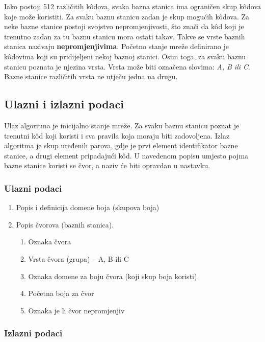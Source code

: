\documentclass[times, utf8, diplomski, numeric]{fer}
\begin{document}
Iako postoji 512 različitih k\^{o}dova, svaka bazna stanica ima ograničen skup k\^{o}dova koje može koristiti. Za svaku baznu stanicu zadan je skup mogućih k\^{o}dova. Za neke bazne stanice postoji svojstvo nepromjenjivosti, što znači da k\^{o}d koji je trenutno zadan za tu baznu stanicu mora ostati takav. Takve se vrste baznih stanica nazivaju \textbf{nepromjenjivima}. Početno stanje mreže definirano je k\^{o}dovima koji su pridijeljeni nekoj baznoj stanici. Osim toga, za svaku baznu stanicu poznata je njezina vrsta. Vrsta može biti označena slovima: \emph{A, B ili C}. Bazne stanice različitih vrsta ne utječu jedna na drugu.

\subsection{Ulazni i izlazni podaci}

Ulaz algoritma je inicijalno stanje mreže. Za svaku baznu stanicu poznat je trenutni k\^{o}d koji koristi i sva pravila koja moraju biti zadovoljena. Izlaz algoritma je skup uređenih parova, gdje je prvi element identifikator bazne stanice, a drugi element pripadajući k\^{o}d. U navedenom popisu umjesto pojma bazne stanice koristi se čvor, a naziv će biti opravdan u nastavku.

\subsubsection{Ulazni podaci}

\begin{enumerate}
	\item Popis i definicija domene boja (skupova boja)
	\item Popis čvorova (baznih stanica).
		\begin{enumerate}
			\item Oznaka čvora
			\item Vrsta čvora (grupa) -- A, B ili C
			\item Oznaka domene za boju čvora (koji skup boja koristi)
			\item Početna boja za čvor
			\item Oznaka je li čvor nepromjenjiv
		\end{enumerate}
\end{enumerate} 

\subsubsection{Izlazni podaci}
\end{document}
